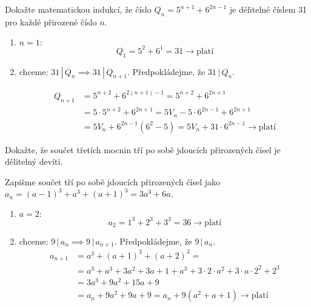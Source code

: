 \begin{example}[SÚM 240/5]
  Dokažte matematickou indukcí, že číslo $Q_n=5^{n+1}+6^{2n-1}$ je dělitelné číslem 31 pro každé přirozené číslo $n$.

  \rm \begin{enumerate}[$i.$]
    \item $n=1:$
    $$Q_1=5^2+6^1=31 \rightarrow \textrm{platí}$$
    \item chceme: $31 \, | \, Q_n \implies 31 \, | \, Q_{n+1}$. Předpokládejme, že $31 \, | \, Q_n.$

    \begin{align*}
      Q_{n+1}&=5^{n+2}+6^{2(n+1)-1}=5^{n+2}+6^{2n+1}\\
      & = 5\cdot 5^{n+2} + 6^{2n+1} = 5V_n - 5\cdot 6^{2n-1}+6^{2n+1} \\
      & = 5V_n + 6 ^{2n-1}(6^2-5)=5V_n + 31 \cdot 6^{2n-1} \rightarrow \textrm{platí}
    \end{align*}
\end{enumerate}
\end{example}

\begin{example}[SÚM 241/8]
  Dokažte, že součet třetích mocnin tří po sobě jdoucích přirozených čísel je dělitelný devíti.

  \rm Zapišme součet tří po sobě jdoucích přirozených čísel jako $a_n = (a-1) ^3 + a^3 + (a+1)^3 = 3a^3+6a.$
  \begin{enumerate}[$i.$]
    \item $a = 2:$
    $$a_2 = 1^3 + 2^3 + 3 ^3 = 36 \rightarrow \textrm{platí}$$
    \item chceme: $9\, | \, a_n \implies 9 \, | \, a_{n+1}$. Předpokládejme, že $9\, | \, a_n.$
    \begin{align*}
      a_{n+1} & = a^3 + (a+1)^3 + (a+2)^3 = \\
      & = a^3 + a^3 + 3a^2 + 3a + 1 + a^3 + 3\cdot 2\cdot a^2 + 3\cdot a\cdot 2^2 + 2^3\\
      &= 3a^3 + 9a^2 + 15a+9\\
      &= a_n + 9a^2 + 9a+ 9 = a_n + 9(a^2+a+1) \rightarrow \textrm{platí}
    \end{align*}
\end{enumerate}
\end{example}

